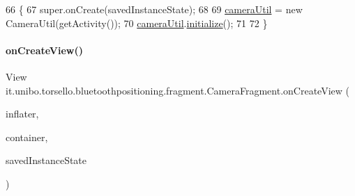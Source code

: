 \begin{DoxyCode}
66                                                               \{
67         super.onCreate(savedInstanceState);
68 
69         \hyperlink{classit_1_1unibo_1_1torsello_1_1bluetoothpositioning_1_1fragment_1_1CameraFragment_a127f286f45219c7891d564cc55e2a80e_a127f286f45219c7891d564cc55e2a80e}{cameraUtil} = \textcolor{keyword}{new} CameraUtil(getActivity());
70         \hyperlink{classit_1_1unibo_1_1torsello_1_1bluetoothpositioning_1_1fragment_1_1CameraFragment_a127f286f45219c7891d564cc55e2a80e_a127f286f45219c7891d564cc55e2a80e}{cameraUtil}.\hyperlink{classit_1_1unibo_1_1torsello_1_1bluetoothpositioning_1_1util_1_1CameraUtil_ae88de176ab49ea6eafa5864701ecc748_ae88de176ab49ea6eafa5864701ecc748}{initialize}();
71 
72     \}
\end{DoxyCode}
\hypertarget{classit_1_1unibo_1_1torsello_1_1bluetoothpositioning_1_1fragment_1_1CameraFragment_a3a80f360922bd6a8c749cda2a09c64cf_a3a80f360922bd6a8c749cda2a09c64cf}{}\label{classit_1_1unibo_1_1torsello_1_1bluetoothpositioning_1_1fragment_1_1CameraFragment_a3a80f360922bd6a8c749cda2a09c64cf_a3a80f360922bd6a8c749cda2a09c64cf} 
\paragraph{\texorpdfstring{on\+Create\+View()}{onCreateView()}}
{\footnotesize\ttfamily View it.\+unibo.\+torsello.\+bluetoothpositioning.\+fragment.\+Camera\+Fragment.\+on\+Create\+View (\begin{DoxyParamCaption}\item[{Layout\+Inflater}]{inflater,  }\item[{View\+Group}]{container,  }\item[{Bundle}]{saved\+Instance\+State }\end{DoxyParamCaption})}


